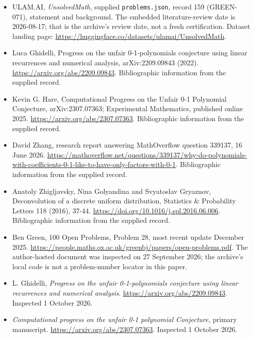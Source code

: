 \documentclass[11pt,a4paper]{article}
\begin{document}
{\small

\begin{itemize}

\item[\hypertarget{source:159:1}{S1}] ULAM.AI, \emph{UnsolvedMath}, supplied \texttt{problems.json}, record 159 (GREEN-071), statement and background. The embedded literature-review date is 2026-08-17; that is the archive’s review date, not a fresh certification. Dataset landing page: \url{https://huggingface.co/datasets/ulamai/UnsolvedMath}.

\item[\hypertarget{source:159:2}{S2}] Luca Ghidelli, Progress on the unfair 0-1-polynomials conjecture using linear recurrences and numerical analysis, arXiv:2209.09843 (2022). \url{https://arxiv.org/abs/2209.09843}. Bibliographic information from the supplied record.

\item[\hypertarget{source:159:3}{S3}] Kevin G. Hare, Computational Progress on the Unfair 0-1 Polynomial Conjecture, arXiv:2307.07363; Experimental Mathematics, published online 2025. \url{https://arxiv.org/abs/2307.07363}. Bibliographic information from the supplied record.

\item[\hypertarget{source:159:4}{S4}] David Zhang, research report answering MathOverflow question 339137, 16 June 2026. \url{https://mathoverflow.net/questions/339137/why-do-polynomials-with-coefficients-0-1-like-to-have-only-factors-with-0-1}. Bibliographic information from the supplied record.

\item[\hypertarget{source:159:5}{S5}] Anatoly Zhigljavsky, Nina Golyandina and Svyatoslav Gryaznov, Deconvolution of a discrete uniform distribution, Statistics \& Probability Letters 118 (2016), 37-44. \url{https://doi.org/10.1016/j.spl.2016.06.006}. Bibliographic information from the supplied record.

\item[\hypertarget{source:159:6}{S6}] Ben Green, 100 Open Problems, Problem 28, most recent update December 2025. \url{https://people.maths.ox.ac.uk/greenbj/papers/open-problems.pdf}. The author-hosted document was inspected on 27 September 2026; the archive’s local code is not a problem-number locator in this paper.

\item[E1] L. Ghidelli, \emph{Progress on the unfair 0-1-polynomials conjecture using linear recurrences and numerical analysis}. \url{https://arxiv.org/abs/2209.09843}. Inspected 1 October 2026.

\item[E2] \emph{Computational progress on the unfair 0-1 polynomial Conjecture}, primary manuscript. \url{https://arxiv.org/abs/2307.07363}. Inspected 1 October 2026.

\end{itemize}

}

\label{end:159}
\end{document}
